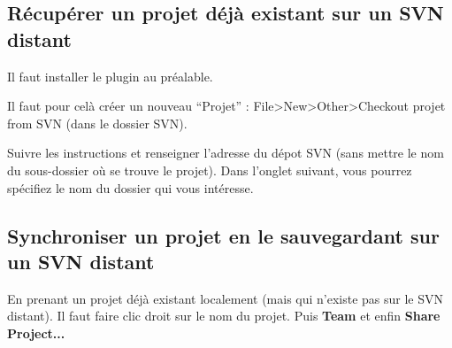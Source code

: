 \documentclass[a4paper,twoside]{article}
\begin{document}
\subsection{Récupérer un projet déjà existant sur un SVN distant}
Il faut installer le plugin  au préalable.

Il faut pour celà créer un nouveau ``Projet'' : File>New>Other>Checkout projet from SVN (dans le dossier SVN).

Suivre les instructions et renseigner l'adresse du dépot SVN (sans mettre le nom du sous-dossier où se trouve le projet). Dans l'onglet suivant, vous pourrez spécifiez le nom du dossier qui vous intéresse.

\subsection{Synchroniser un projet en le sauvegardant sur un SVN distant}
En prenant un projet déjà existant localement (mais qui n'existe pas sur le SVN distant). Il faut faire clic droit sur le nom du projet. Puis \textbf{Team} et enfin \textbf{Share Project...}

\printindex
\end{document}
